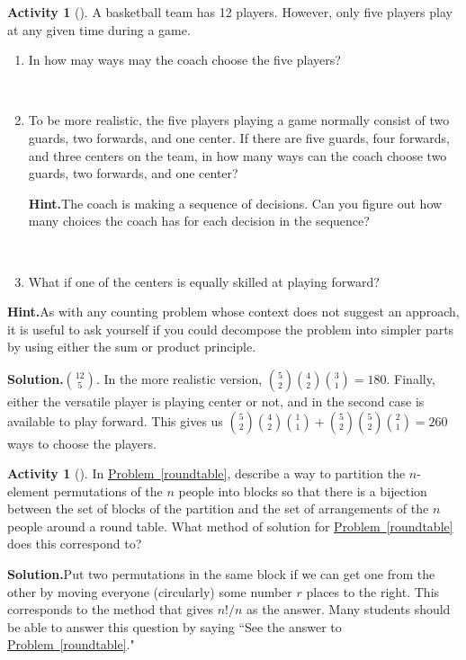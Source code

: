 \documentclass[10pt,]{book}
\theoremstyle{plain}
\theoremstyle{definition}
\newtheorem{activity}[project]{Activity}
\numberwithin{equation}{chapter}
\begin{document}
\begin{activity}[]\label{activity-40}
A basketball team has 12 players. However, only five players play at any given time during a game.%
~\par
\begin{enumerate}[label=(\alph*)]
 \item In how may ways may the coach choose the five players?%

~\par
\item To be more realistic, the five players playing a game normally consist of two guards, two forwards, and one center.  If there are five guards, four forwards, and three centers on the team, in how many ways can the coach choose two guards, two forwards, and one center?%
\par\medskip\noindent%
\textbf{Hint.}\quad The coach is making a sequence of decisions. Can you figure out how many choices the coach has for each decision in the sequence?%

~\par
\item What if one of the centers is equally skilled at playing forward?%

\end{enumerate}
\par\medskip\noindent%
\textbf{Hint.}\quad As with any counting problem whose context does not suggest an approach, it is useful to ask yourself if you could decompose the problem into simpler parts by using either the sum or product principle.%
\par\medskip\noindent%
\textbf{Solution.}\quad \(\binom{12}{5}\). In the more realistic version, \(\binom{5}{2}\binom{4}{2}\binom{3}{1}=180\). Finally, either the versatile player is playing center or not, and in the second case is available to play forward. This gives us \(\binom{5}{2}\binom{4}{2}\binom{1}{1}+\binom{5}{2}\binom{5}{2}\binom{2}{1}=260\) ways to choose the players.%
\end{activity}
\begin{activity}[]\label{roundtablepartition}
In \hyperref[roundtable]{Problem~\ref{roundtable}}, describe a way to partition the \(n\)-element permutations of the \(n\) people into blocks so that there is a bijection between the set of blocks of the partition and the set of arrangements of the \(n\) people around a round table. What method of solution for \hyperref[roundtable]{Problem~\ref{roundtable}} does this correspond to?%
\par\medskip\noindent%
\textbf{Solution.}\quad Put two permutations in the same block if we can get one from the other by moving everyone (circularly) some number \(r\) places to the right. This corresponds to the method that gives \(n!/n\) as the answer. Many students should be able to answer this question by saying ``See the answer to \hyperref[roundtable]{Problem~\ref{roundtable}}."%
\end{activity}
\end{document}
